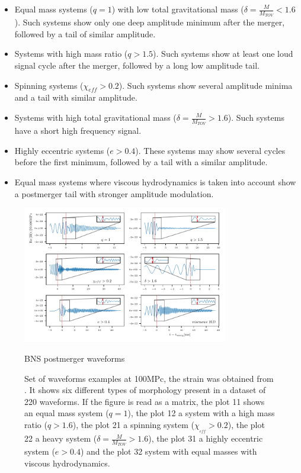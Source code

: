 \begin{itemize}
\item Equal mass systems ($q=1$) with low total gravitational mass ($\delta=\frac{M}{M_{TOV}}<1.6$). Such systems show only one deep amplitude minimum after the merger, followed by a tail of similar amplitude.

\item Systems with high mass ratio ($q>1.5$). Such systems show at least one loud signal cycle after the merger, followed by a long low amplitude tail.

\item Spinning systems ($\chi_{eff}>0.2$). Such systems show several amplitude minima and a tail with similar amplitude.

\item Systems with high total gravitational mass ($\delta=\frac{M}{M_{TOV}}>1.6$). Such systems have a short high frequency signal.

\item Highly eccentric systems ($e>0.4$). These systems may show several cycles before the first minimum, followed by a tail with a similar amplitude.

\item Equal mass systems where viscous hydrodynamics is taken into account show a postmerger tail with stronger amplitude modulation.

\end{itemize}


\begin{figure}[hbt!]
\begin{center}
\includegraphics[width=0.8\textwidth, angle=0]{images/Data_analysis/results/postm_wf_grid.pdf}
\captionsetup{width=0.8\textwidth}
\caption{BNS postmerger waveforms}
\caption*{Set of waveforms examples at 100MPc, the strain was obtained from \cite{}. It shows six different types of morphology present in a dataset of 220 waveforms. If the figure is read as a matrix, the plot 11 shows an equal mass system ($q=1$), the plot 12 a system with a high mass ratio ($q>1.6$), the plot 21 a spinning system ($\chi_{_{eff}}>0.2$), the plot 22 a heavy system ($\delta=\frac{M}{M_{TOV}}>1.6$), the plot 31 a highly eccentric system ($e>0.4$) and the plot 32 system with equal masses with viscous hydrodynamics.}
\end{center}
\label{fig:10}
\end{figure}

